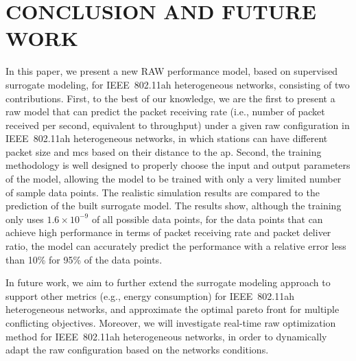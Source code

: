 \section{CONCLUSION AND FUTURE WORK \label{sec:conclusion}}

In this paper, we present a new RAW performance model, based on supervised surrogate modeling, for IEEE~802.11ah heterogeneous networks, consisting of
two contributions. First, to the best of our knowledge, we are the first to present a \gls{raw} model that can predict the packet receiving rate (i.e., number of packet received per second, equivalent to throughput) under a given \gls{raw} configuration in IEEE~802.11ah heterogeneous networks, in which stations can have different packet size and \gls{mcs} based on their distance to the \gls{ap}. Second, the training methodology is well designed to properly choose the input and output parameters of the model, allowing the model to be trained with only a very limited number of sample data points. The realistic simulation results are compared to the prediction of the built surrogate model. The results show, although the training only uses $1.6 \times 10^{-9}$ of all possible data points, for the data points that can achieve high performance in terms of packet receiving rate and packet deliver ratio,  the model can accurately predict the performance with a relative error less than 10\% for 95\% of the data points. 

In future work, we aim to further extend the surrogate modeling approach to support other metrics (e.g., energy consumption) for IEEE~802.11ah heterogeneous networks, and approximate the optimal pareto front for multiple conflicting objectives. Moreover, we will investigate real-time \gls{raw} optimization method for IEEE~802.11ah heterogeneous networks, in order to dynamically adapt the \gls{raw} configuration based on the networks conditions.   





 




